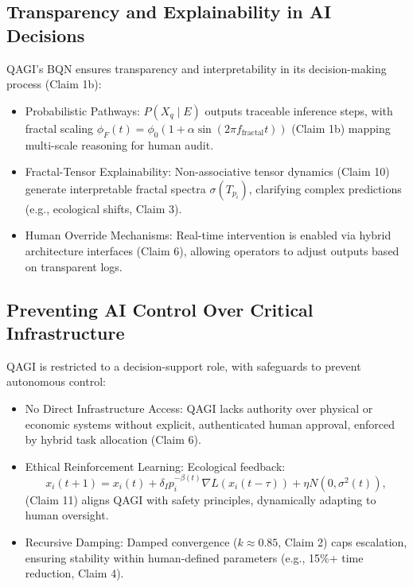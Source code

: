 \documentclass{article}
\theoremstyle{plain}
\theoremstyle{claimstyle}
\begin{document}
\subsection{Transparency and Explainability in AI Decisions}
QAGI’s BQN ensures transparency and interpretability in its decision-making process (Claim 1b):

\begin{itemize}
    \item Probabilistic Pathways: \( P(X_q \mid E) \) outputs traceable inference steps, with fractal scaling \( \phi_F(t) = \phi_0 (1 + \alpha \sin(2\pi f_{\text{fractal}} t)) \) (Claim 1b) mapping multi-scale reasoning for human audit.
    \item Fractal-Tensor Explainability: Non-associative tensor dynamics (Claim 10) generate interpretable fractal spectra \( \sigma(T_{p_i}) \), clarifying complex predictions (e.g., ecological shifts, Claim 3).
    \item Human Override Mechanisms: Real-time intervention is enabled via hybrid architecture interfaces (Claim 6), allowing operators to adjust outputs based on transparent logs.
\end{itemize}

\subsection{Preventing AI Control Over Critical Infrastructure}
QAGI is restricted to a decision-support role, with safeguards to prevent autonomous control:

\begin{itemize}
    \item No Direct Infrastructure Access: QAGI lacks authority over physical or economic systems without explicit, authenticated human approval, enforced by hybrid task allocation (Claim 6).
    \item Ethical Reinforcement Learning: Ecological feedback:
    \begin{equation}
    x_i(t+1) = x_i(t) + \delta_I p_i^{-\beta(t)} \nabla L(x_i(t - \tau)) + \eta N(0, \sigma^2(t)),
    \end{equation}
    (Claim 11) aligns QAGI with safety principles, dynamically adapting to human oversight.
    \item Recursive Damping: Damped convergence (\( k \approx 0.85 \), Claim 2) caps escalation, ensuring stability within human-defined parameters (e.g., 15\%+ time reduction, Claim 4).
\end{itemize}
\end{document}
